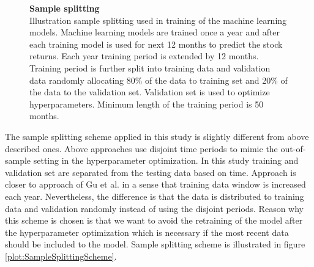 \documentclass{article}
\begin{document}
\begin{figure}[h]
\centering
\label{plot:SampleSplittingScheme}
\caption[Sample splitting scheme]{\textbf{Sample splitting}\\ Illustration sample splitting used in training of the machine learning models. Machine learning models are trained once a year and after each training model is used for next 12 months to predict the stock returns. Each year training period is extended by 12 months. Training period is further split into training data and validation data randomly allocating 80\% of the data to training set and 20\% of the data to the validation set. Validation set is used to optimize hyperparameters. Minimum length of the training period is 50 months.}
\label{plot:Turnover}
\end{figure}

The sample splitting scheme applied in this study is slightly different from above described ones. Above approaches use disjoint time periods to mimic the out-of-sample setting in the hyperparameter optimization. In this study training and validation set are separated from the testing data based on time. Approach is closer to approach of Gu et al. \citeyear{guetal} in a sense that training data window is increased each year. Nevertheless, the difference is that the data is distributed to training data and validation randomly instead of using the disjoint periods. Reason why this scheme is chosen is that we want to avoid the retraining of the model after the hyperparameter optimization which is necessary if the most recent data should be included to the model. Sample splitting scheme is illustrated in figure \ref{plot:SampleSplittingScheme}. \par
\end{document}
